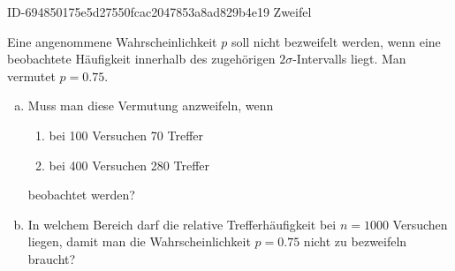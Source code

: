 \begin{exercise}
      {ID-694850175e5d27550fcac2047853a8ad829b4e19}
      {Zweifel}
  \ifproblem\problem\par
    Eine angenommene Wahrscheinlichkeit $p$ soll nicht
    bezweifelt werden, wenn eine beobachtete Häufigkeit
    innerhalb des zugehörigen $2\sigma$-Intervalls liegt.
    Man vermutet $p=\num{0.75}$.
    \begin{enumerate}[a)]
      \item Muss man diese Vermutung anzweifeln, wenn
            \begin{enumerate}[1.]
              \setlength{\itemsep}{-1ex}%
              \item bei \num{100} Versuchen \num{70} Treffer
              \item bei \num{400} Versuchen \num{280} Treffer
            \end{enumerate}
            beobachtet werden?
      \item In welchem Bereich darf die relative
            Trefferhäufigkeit bei $n=\num{1000}$
            Versuchen liegen, damit man die
            Wahrscheinlichkeit $p=\num{0.75}$
            nicht zu bezweifeln braucht?
    \end{enumerate}
  \fi
\end{exercise}
